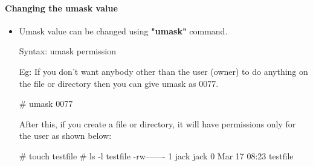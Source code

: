 \begin{flushleft}
\newpage
		
		
	\paragraph{Changing the umask value}
	\begin{itemize}
		\item Umask value can be changed using \textbf{"umask"} command.
		\bigskip
		\begin{tcolorbox}[breakable,notitle,boxrule=0pt,colback=pink,colframe=pink]
			\color{black}
			\font=9pt
			Syntax: umask permission
			\font=4pt
		\end{tcolorbox}
		Eg: If you don’t want anybody other than the user (owner) to do anything on the file or directory then you can give umask as 0077.
		\bigskip
		\begin{tcolorbox}[breakable,notitle,boxrule=-0pt,colback=black,colframe=black]
			\color{green}
			\font=9pt
			\# umask 0077
			\font=4pt
		\end{tcolorbox}
		\bigskip
		After this, if you create a file or directory, it will have permissions only for the user
		as shown below:
		\bigskip
		\begin{tcolorbox}[breakable,notitle,boxrule=-0pt,colback=black,colframe=black]
			\color{green}
			\font=9pt
			\# touch testfile
			\newline
			\# ls -l testfile
			\newline
			\color{white}
			-rw------- 1 jack jack 0 Mar 17 08:23 testfile
			\font=4pt
		\end{tcolorbox}
		
	\end{itemize}

	
\end{flushleft}

\newpage

